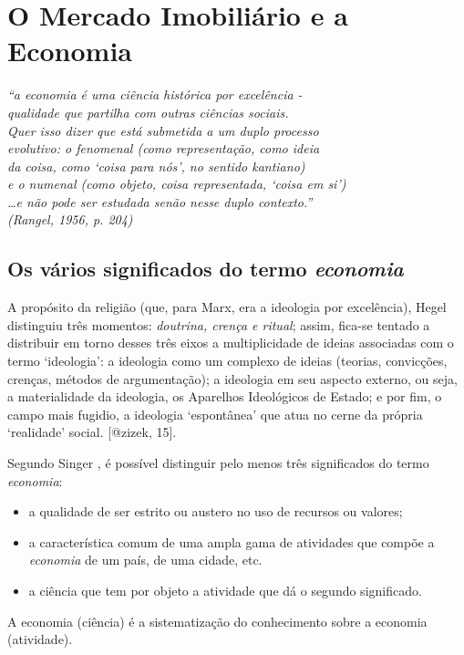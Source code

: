 \documentclass[
	12pt,				%
	oneside,			%
	a4paper,			%
	chapter=TITLE,		%
	section=TITLE,		%
	english,			%
	brazil				%
	]{abntex2}
\begin{document}
\hypertarget{economia}{%
\chapter{O Mercado Imobiliário e a Economia}\label{economia}}
\begin{epigrafe}
    \vspace*{\fill}
    \begin{flushright}
    \textit{``a economia é uma ciência histórica por excelência -\\
    qualidade que partilha com outras ciências sociais.\\
    Quer isso dizer que está submetida a um duplo processo\\
    evolutivo: o fenomenal (como representação, como ideia \\
    da coisa, como `coisa para nós', no sentido kantiano)\\
    e o numenal (como objeto, coisa representada, `coisa em si')\\
    \ldots e não pode ser estudada senão nesse duplo contexto.''\\
    (Rangel, 1956, p. 204)}
    \end{flushright}
\end{epigrafe}
\hypertarget{os-vuxe1rios-significados-do-termo}{%
\section{\texorpdfstring{Os vários significados do termo \emph{economia}}{Os vários significados do termo }}\label{os-vuxe1rios-significados-do-termo}}
\begin{citacao}
A propósito da religião (que, para Marx, era a ideologia por excelência), Hegel
distinguiu três momentos: \emph{doutrina, crença e ritual}; assim, fica-se
tentado a distribuir em torno desses três eixos a multiplicidade de ideias
associadas com o termo `ideologia': a ideologia como um complexo de ideias
(teorias, convicções, crenças, métodos de argumentação); a ideologia em seu
aspecto externo, ou seja, a materialidade da ideologia, os Aparelhos Ideológicos
de Estado; e por fim, o campo mais fugidio, a ideologia `espontânea' que atua
no cerne da própria `realidade' social.
\cite[p.~15]{zizek} [@zizek, 15].
\end{citacao}
Segundo Singer \autocite*[7]{singer}, é possível distinguir pelo menos três significados
do termo \emph{economia}:
\begin{itemize}
\tightlist
\item
  a qualidade de ser estrito ou austero no uso de recursos ou valores;
\item
  a característica comum de uma ampla gama de atividades que compõe a \emph{economia}
  de um país, de uma cidade, etc.
\item
  a ciência que tem por objeto a atividade que dá o segundo significado.
\end{itemize}
A economia (ciência) é a sistematização do conhecimento sobre a economia
(atividade).
\end{document}
